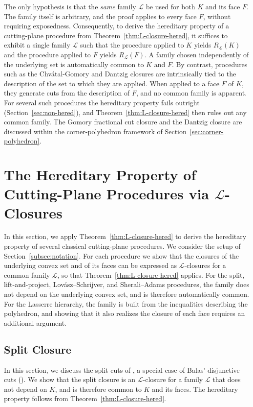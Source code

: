 \documentclass{article}
\renewcommand{\L}{\mathcal{L}}
\begin{document}
The only hypothesis is that the \emph{same} family $\L$ be used for both $K$ and its face $F$. The family itself is arbitrary, and the proof applies to every face $F$, without requiring exposedness. Consequently, to derive the hereditary property of a cutting-plane procedure from Theorem~\ref{thm:L-closure-hered}, it suffices to exhibit a single family $\L$ such that the procedure applied to $K$ yields $R_\L(K)$ and the procedure applied to $F$ yields $R_\L(F)$. A family chosen independently of the underlying set is automatically common to $K$ and $F$. By contrast, procedures such as the Chv\'atal-Gomory and Dantzig closures are intrinsically tied to the description of the set to which they are applied. When applied to a face $F$ of $K$, they generate cuts from the description of $F$, and no common family is apparent. For several such procedures the hereditary property fails outright (Section~\ref{sec:non-hered}), and Theorem~\ref{thm:L-closure-hered} then rules out any common family. The Gomory fractional cut closure and the Dantzig closure are discussed within the corner-polyhedron framework of Section~\ref{sec:corner-polyhedron}.

\section{The Hereditary Property of Cutting-Plane Procedures via \texorpdfstring{$\L$}{L}-Closures} \label{sec:L-closure-applications}

In this section, we apply Theorem~\ref{thm:L-closure-hered} to derive the hereditary property of several classical cutting-plane procedures. We consider the setup of Section~\ref{subsec:notation}. For each procedure we show that the closures of the underlying convex set and of its faces can be expressed as $\L$-closures for a common family $\L$, so that Theorem~\ref{thm:L-closure-hered} applies. For the split, lift-and-project, Lov\'asz--Schrijver, and Sherali--Adams procedures, the family does not depend on the underlying convex set, and is therefore automatically common. For the Lasserre hierarchy, the family is built from the inequalities describing the polyhedron, and showing that it also realizes the closure of each face requires an additional argument.

\subsection{Split Closure} \label{sec:split}

In this section, we discuss the split cuts of \cite{cook1990chvatal}, a special case of Balas' disjunctive cuts (\cite{balas1979disjunctive}). We show that the split closure is an $\L$-closure for a family $\L$ that does not depend on $K$, and is therefore common to $K$ and its faces. The hereditary property follows from Theorem~\ref{thm:L-closure-hered}.
\end{document}
